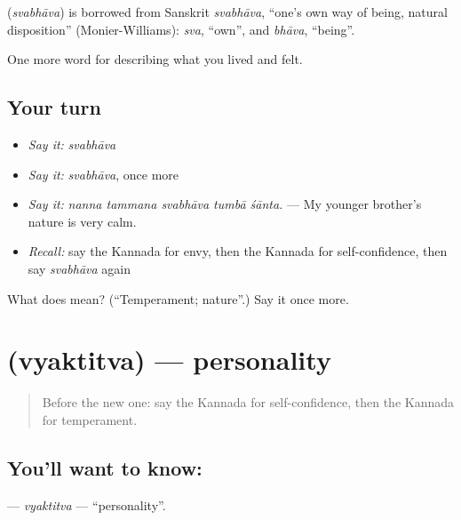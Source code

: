 \begin{cousinweb}
\textbf{} (\emph{svabhāva}) is borrowed from Sanskrit \emph{svabhāva}, \textquotedblleft{}one's own way of being, natural disposition\textquotedblright{} (Monier-Williams): \emph{sva}, \textquotedblleft{}own\textquotedblright{}, and \emph{bhāva}, \textquotedblleft{}being\textquotedblright{}.
\end{cousinweb}

\begin{grammarlens}[title={What you've built}]
One more word for describing what you lived and felt.
\end{grammarlens}

\subsection*{Your turn}
\begin{itemize}
\raggedright
  \item \emph{Say it:} \emph{svabhāva}
  \item \emph{Say it:} \emph{svabhāva}, once more
  \item \emph{Say it:} \emph{nanna tammana svabhāva tumbā śānta.} — My younger brother's nature is very calm.
  \item \emph{Recall:} say the Kannada for envy, then the Kannada for self-confidence, then say \emph{svabhāva} again
\end{itemize}

\begin{tcolorbox}[breakable,colback=teal!4,colframe=teal!35!black,title={Before you move on}]
What does  mean? (\textquotedblleft{}Temperament; nature\textquotedblright{}.) Say it once more.
\end{tcolorbox}
\section[\texorpdfstring{\kn{ವ್ಯಕ್ತಿತ್ವ} (vyaktitva)}{ವ್ಯಕ್ತಿತ್ವ (vyaktitva)}]{ (vyaktitva) — personality}

\label{lesson:KA-C500-vyaktitva}



\begin{quote}
Before the new one: say the Kannada for self-confidence, then the Kannada for temperament.
\end{quote}

\subsection*{You'll want to know: }
\textbf{} — \emph{vyaktitva} — \textquotedblleft{}personality\textquotedblright{}.

